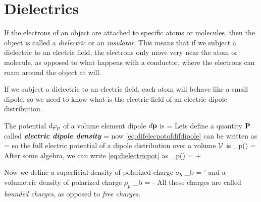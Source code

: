 \documentclass[oneside, 12pt, notitlepage]{book}
\begin{document}
\frontmatter
\mainmatter
\pagestyle{mynotespage} %

\chapter{Dielectrics}

If the electrons of an object are attached to specific atoms or molecules, then the object is called a \textit{dielectric} or an \textit{insulator}. This means that if we subject a dielectric to an electric field, the electrons only move very near the atom or molecule, as opposed to what happens with a conductor, where the electrons can roam around the object at will.\par

If we subject a dielectric to an electric field, each atom will behave like a small dipole, so we need to know what is the electric field of an electric dipole distribution.\par

The potential \(\dd{\varphi_p} \) of a volume element dipole \( \dd{\vb{p}}\) is
\beq[eq:difelecpotofdifdipole]  =  \eeq
Lets define a quantity \(\vb{P}\) called \textit{\textbf{electric dipole density}}
\beq[]  =  \eeq
now \eqref{eq:difelecpotofdifdipole} can be written as
\beq[]  =  \eeq
so the full electric potential of a dipole distribution over a volume \(\mathcal{V}\) is
\beq[eq:dielectricpot] \epot_p() =   \eeq
After some algebra, we can write \eqref{eq:dielectricpot} as
\beq[] \epot_p() = \uoint[\del{\mc{V}}]\cdot {} + \uint[\mc{V}] \eeq

Now we define a superficial density of polarized charge \(\sigma_b\)
\beq[] \sigma_b = '\cdot{} \eeq
and a volumetric density of polarized charge \(\rho_p\)
\beq[] \rho_b = - \eeq
All these charges are called \textit{bounded charges}, as opposed to \textit{free charges}.\par
\end{document}
